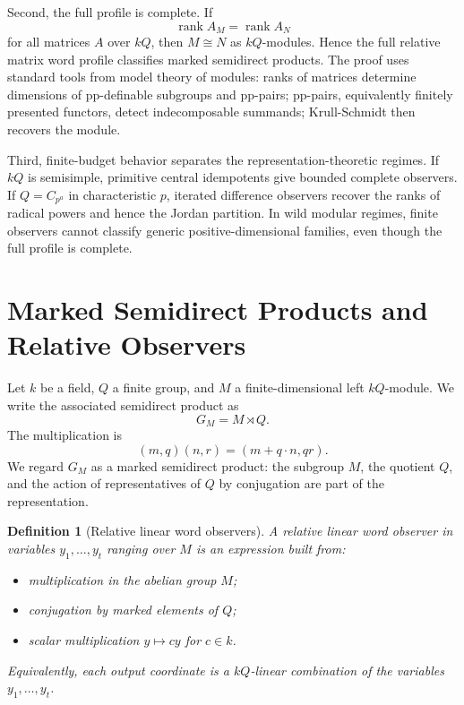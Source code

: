 \documentclass[11pt]{article}
\newtheorem{definition}[theorem]{Definition}
\begin{document}
Second, the full profile is complete. If
\[
\operatorname{rank}A_M=\operatorname{rank}A_N
\]
for all matrices $A$ over $kQ$, then $M\cong N$ as $kQ$-modules. Hence the full relative matrix word profile classifies marked semidirect products. The proof uses standard tools from model theory of modules: ranks of matrices determine dimensions of pp-definable subgroups and pp-pairs; pp-pairs, equivalently finitely presented functors, detect indecomposable summands; Krull-Schmidt then recovers the module.

Third, finite-budget behavior separates the representation-theoretic regimes. If $kQ$ is semisimple, primitive central idempotents give bounded complete observers. If $Q=C_{p^a}$ in characteristic $p$, iterated difference observers recover the ranks of radical powers and hence the Jordan partition. In wild modular regimes, finite observers cannot classify generic positive-dimensional families, even though the full profile is complete.

\section{Marked Semidirect Products and Relative Observers}

Let $k$ be a field, $Q$ a finite group, and $M$ a finite-dimensional left $kQ$-module. We write the associated semidirect product as
\[
G_M=M\rtimes Q.
\]
The multiplication is
\[
(m,q)(n,r)=(m+q\cdot n,qr).
\]
We regard $G_M$ as a marked semidirect product: the subgroup $M$, the quotient $Q$, and the action of representatives of $Q$ by conjugation are part of the representation.

\begin{definition}[Relative linear word observers]
A relative linear word observer in variables $y_1,\ldots,y_t$ ranging over $M$ is an expression built from:
\begin{itemize}
\item multiplication in the abelian group $M$;
\item conjugation by marked elements of $Q$;
\item scalar multiplication $y\mapsto cy$ for $c\in k$.
\end{itemize}
Equivalently, each output coordinate is a $kQ$-linear combination of the variables $y_1,\ldots,y_t$.
\end{definition}
\end{document}
